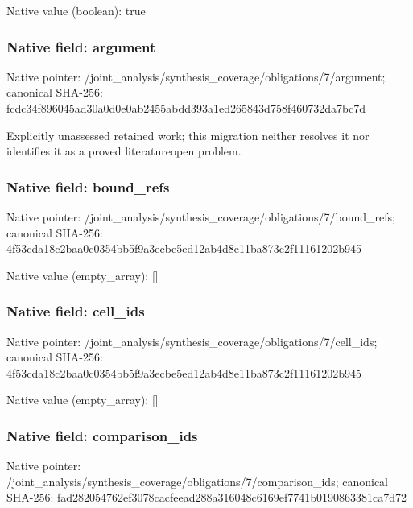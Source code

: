 \documentclass[10pt,a4paper]{article}
\begin{document}
Native value (boolean): true



\subsubsection{Native field: argument}


Native pointer: /joint\_analysis/synthesi\allowbreak{}s\_coverage/obligations/7\allowbreak{}/argument; canonical SHA-256: fcdc34f896045ad30a0d0e0a\allowbreak{}b2455abdd393a1ed265843d7\allowbreak{}58f460732da7bc7d


Explicitly unassessed retained work; this migration neither resolves it nor identifies it as a proved literatureopen problem.


\subsubsection{Native field: bound\_refs}


Native pointer: /joint\_analysis/synthesi\allowbreak{}s\_coverage/obligations/7\allowbreak{}/bound\_refs; canonical SHA-256: 4f53cda18c2baa0c0354bb5f\allowbreak{}9a3ecbe5ed12ab4d8e11ba87\allowbreak{}3c2f11161202b945



Native value (empty\_array): []



\subsubsection{Native field: cell\_ids}


Native pointer: /joint\_analysis/synthesi\allowbreak{}s\_coverage/obligations/7\allowbreak{}/cell\_ids; canonical SHA-256: 4f53cda18c2baa0c0354bb5f\allowbreak{}9a3ecbe5ed12ab4d8e11ba87\allowbreak{}3c2f11161202b945



Native value (empty\_array): []



\subsubsection{Native field: comparison\_ids}


Native pointer: /joint\_analysis/synthesi\allowbreak{}s\_coverage/obligations/7\allowbreak{}/comparison\_ids; canonical SHA-256: fad282054762ef3078cacfee\allowbreak{}ad288a316048c6169ef7741b\allowbreak{}0190863381ca7d72
\end{document}
